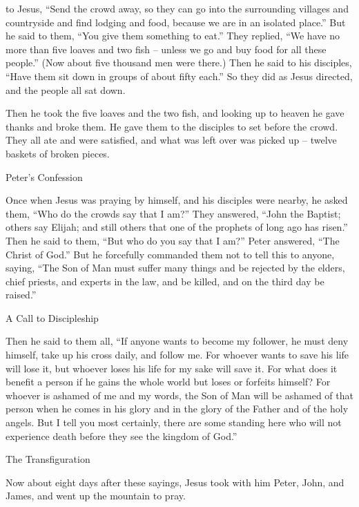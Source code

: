 {to Jesus, “Send
the crowd
away, so
they can go
into
the surrounding
villages
and
countryside
and
find
lodging
and food, because
we are in
an isolated
place.”
But
he said
to
them,
“You give
them
something to eat.”
They replied, “We have
no
more
than
five
loaves
and
two
fish
– unless
we
go
and buy
food
for
all
these
people.”
(Now about
five thousand
men
were there.) Then
he said
to
his
disciples,
“Have
them
sit down
in groups
of about
fifty
each.”
So
they did
as Jesus directed, and the people all
sat down.
\par }{\PP {}Then he took
the five
loaves
and
the two
fish,
and looking up
to
heaven
he gave thanks
and
broke
them.
He gave
them to the disciples
to set before
the crowd.
They
all
ate
and
were satisfied,
and
what was left over
was picked up
– twelve
baskets
of broken pieces.
\par }{\SH Peter’s Confession
\par }{\PP {}Once when
Jesus was praying
by
himself,
and his disciples
were nearby,
he asked
them, “Who
do the crowds
say
that I
am?”
They
answered, “John
the Baptist;
others
say
Elijah;
and still others
that
one of the prophets
of long ago
has risen.”
Then
he said
to them,
“But
who
do you say
that I
am?” Peter
answered, “The Christ
of God.”
But
he forcefully
commanded
them
not
to tell
this
to anyone,
saying,
“The Son
of Man
must
suffer
many things
and
be rejected
by
the elders,
chief priests,
and
experts in the law,
and
be killed,
and
on the third
day
be raised.”
\par }{\SH A Call to Discipleship
\par }{\PP {}Then
he said
to
them all, “If
anyone
wants
to become
my
follower,
he must deny
himself,
take up
his
cross
daily,
and
follow
me.
For
whoever
wants
to save
his
life
will lose
it,
but
whoever
loses
his
life
for
my
sake
will save
it.
For
what
does it benefit
a person
if he gains
the whole
world
but
loses
or
forfeits
himself?
For
whoever
is ashamed
of me
and
my
words,
the Son
of Man
will be ashamed
of that person when
he comes
in
his
glory
and
in the glory of the Father
and
of the holy
angels.
But
I tell
you
most certainly,
there are
some
standing
here who
will
not
experience
death
before
they see
the kingdom
of God.”
\par }{\SH The Transfiguration
\par }{\PP {}Now about eight
days
after
these
sayings,
Jesus took
with him Peter,
John,
and
James,
and went up
the mountain
to pray.
}
